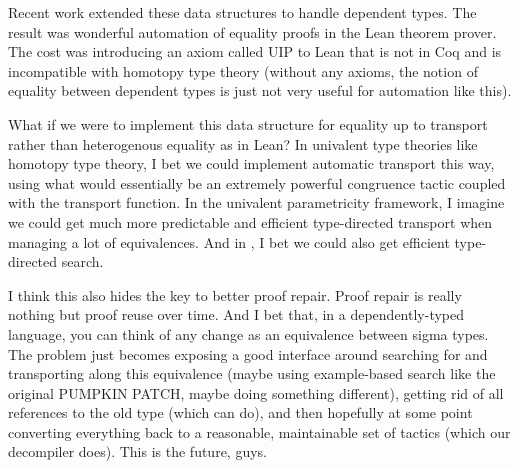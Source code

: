 Recent work extended these data structures to handle dependent types. The result was wonderful automation of equality proofs in the Lean theorem prover. The cost was introducing an axiom called UIP to Lean that is not in Coq and is incompatible with homotopy type theory (without any axioms, the notion of equality between dependent types is just not very useful for automation like this).

What if we were to implement this data structure for equality up to transport rather than heterogenous equality as in Lean? In univalent type theories like homotopy type theory, I bet we could implement automatic transport this way, using what would essentially be an extremely powerful congruence tactic coupled with the transport function. In the univalent parametricity framework, I imagine we could get much more predictable and efficient type-directed transport when managing a lot of equivalences. And in \toolname, I bet we could also get efficient type-directed search.

I think this also hides the key to better proof repair. Proof repair is really nothing but proof reuse over time. And I bet that, in a dependently-typed language, you can think of any change as an equivalence between sigma types. The problem just becomes exposing a good interface around searching for and transporting along this equivalence (maybe using example-based search like the original PUMPKIN PATCH, maybe doing something different), getting rid of all references to the old type (which \toolname can do), and then hopefully at some point converting everything back to a reasonable, maintainable set of tactics (which our decompiler does). This is the future, guys.


